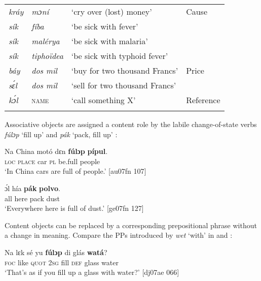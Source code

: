 \begin{table}[t]
\begin{tabularx}{\textwidth}{llXl}
\tablevspace
\itshape kráy & \itshape mɔní & ‘cry over (lost) money’ & Cause\\
\itshape sík & \itshape fíba & ‘be sick with fever’ & \\
\itshape sík & \itshape malérya & ‘be sick with malaria’ & \\
\itshape sík & \itshape tiphoïdea & ‘be sick with typhoid fever’ & \\

\tablevspace
\itshape báy & \itshape dos mil & ‘buy for two thousand Francs’ & Price\\
\itshape sɛ́l & \itshape dos mil & ‘sell for two thousand Francs’ & \\

\tablevspace
\itshape kɔ́l & \textsc{name} & ‘call something X’ & Reference\\
\lspbottomrule
\end{tabularx}
\end{table}
Associative objects are assigned a content role by the labile change-of-state verbs \textit{fúlɔp} ‘fill up’  and \textit{pák} ‘pack, fill up’ : 


\ea%
    \label{ex:key:1173}
    \gll Na  China  motó  dɛn  \textbf{fúlɔp}  \textbf{pípul}.\\
\textsc{loc}  \textsc{place}  car    \textsc{pl}  be.full  people\\

\glt ‘In China cars are full of people.’ [au07fn 107]
\z


\ea%
    \label{ex:key:1174}
    \gll ɔ́l  hía    \textbf{pák}    \textbf{polvo}.\\
all  here    pack  dust\\

\glt ‘Everywhere here is full of dust.’ [ge07fn 127]
\z

Content objects can be replaced by a corresponding prepositional phrase without a change in meaning. Compare the PPs introduced by \textit{wet} ‘with’ in  and :


\ea%
    \label{ex:key:1175}
    \gll Na  lɛk  sé    yu  \textbf{fúlɔp}  di  glás    \textbf{watá}?\\
\textsc{foc}  like  \textsc{quot}    \textsc{2sg}  fill    \textsc{def}  glass  water\\

\glt ‘That’s as if you fill up a glass with water?’ [dj07ae 066]
\z


